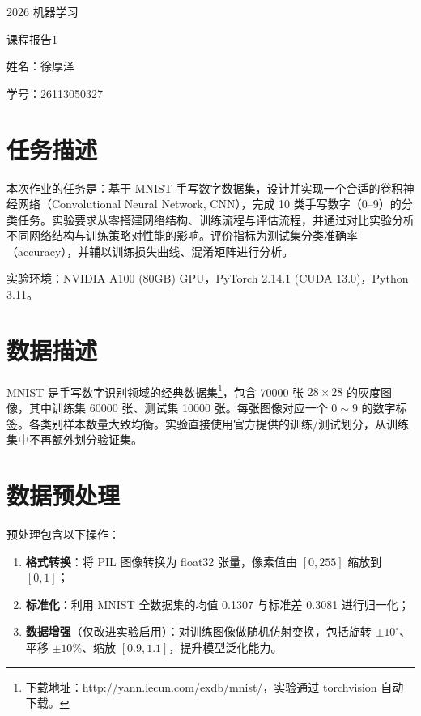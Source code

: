 \documentclass[UTF8,zihao=-4]{ctexart}
\newcommand{\ReportCourse}{2026 机器学习}
\newcommand{\ReportNo}{1}
\newcommand{\ReportName}{徐厚泽}
\newcommand{\ReportStudentID}{26113050327}
\begin{document}
\begin{titlepage}
  \centering
  \vspace*{1.2cm}
  {\heiti{}\ReportCourse\par}
  \vspace{1.5em}
  {\heiti{}课程报告\ReportNo\par}
  \vfill
  {\kaishu{}姓名：\ReportName\par}
  \vspace{0.8em}
  {\kaishu{}学号：\ReportStudentID\par}
  \vfill
\end{titlepage}

\section{任务描述}
本次作业的任务是：基于 MNIST 手写数字数据集，设计并实现一个合适的卷积神经网络（Convolutional Neural Network, CNN），完成 10 类手写数字（0--9）的分类任务。实验要求从零搭建网络结构、训练流程与评估流程，并通过对比实验分析不同网络结构与训练策略对性能的影响。评价指标为测试集分类准确率（accuracy），并辅以训练损失曲线、混淆矩阵进行分析。

实验环境：NVIDIA A100 (80GB) GPU，PyTorch 2.14.1 (CUDA 13.0)，Python 3.11。

\section{数据描述}
MNIST 是手写数字识别领域的经典数据集\footnote{下载地址：\url{http://yann.lecun.com/exdb/mnist/}，实验通过 torchvision 自动下载。}，包含 70000 张 $28\times 28$ 的灰度图像，其中训练集 60000 张、测试集 10000 张。每张图像对应一个 $0\sim 9$ 的数字标签。各类别样本数量大致均衡。实验直接使用官方提供的训练/测试划分，从训练集中不再额外划分验证集。

\section{数据预处理}
预处理包含以下操作：
\begin{enumerate}
  \item \textbf{格式转换}：将 PIL 图像转换为 float32 张量，像素值由 $[0,255]$ 缩放到 $[0,1]$；
  \item \textbf{标准化}：利用 MNIST 全数据集的均值 0.1307 与标准差 0.3081 进行归一化；
  \item \textbf{数据增强}（仅改进实验启用）：对训练图像做随机仿射变换，包括旋转 $\pm 10^\circ$、平移 $\pm 10\%$、缩放 $[0.9,1.1]$，提升模型泛化能力。
\end{enumerate}
\end{document}

